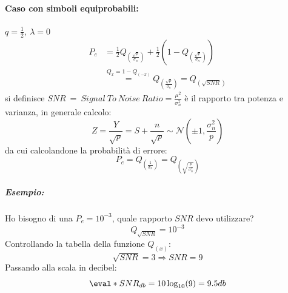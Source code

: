             \paragraph{Caso con simboli equiprobabili:} $q=\frac{1}{2},\ \lambda = 0$
                \begin{align}
                    P_e &= \frac{1}{2}Q_{\left(\frac{\sqrt{p}}{\sigma_n}\right)}+ \frac{1}{2}\left(1-Q_{\left(\frac{\sqrt{p}}{\sigma_n}\right)}\right)\nonumber \\
                        &\overset{Q_{x} = 1-Q_{(-x)}}{=} Q_{\left(\frac{\sqrt{p}}{\sigma_n}\right)} = Q_{(\sqrt{SNR})}\nonumber  
                \end{align}
                si definisce $SNR\ =\ Signal\ To\ Noise\ Ratio =\frac{\mu^2}{\sigma_n^2}$ è il rapporto tra potenza e varianza, in generale calcolo:
                \[
                    Z = \frac{Y}{\sqrt{p}} = S+\frac{n}{\sqrt{p}} \sim \mathcal{N}(\pm 1,\frac{\sigma_n^2}{p})   
                \] 
                da cui calcolandone la probabilità di errore:
                \[
                    P_e = Q_{\left(\frac{1}{\sigma_n}\right)} = Q_{\left(\sqrt{\frac{p}{\sigma_n^2}}\right)}
                \]
                \subparagraph*{Esempio:} Ho bisogno di una $P_e = 10^{-3}$, quale rapporto $SNR$ devo utilizzare?
                \[
                    Q_{\sqrt{SNR}} = 10^{-3}   
                \]
                Controllando la tabella della funzione $Q_{(x)}$:
                \[
                    \sqrt{SNR} = 3 \Rightarrow SNR=9    
                \]
                Passando alla scala in decibel:
                \[
                    \eval*{SNR}_{db} = 10 \log_{10}(9) = 9.5db    
                \]
